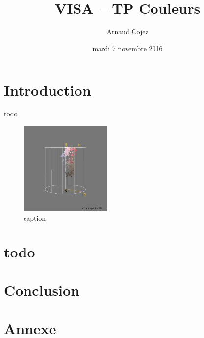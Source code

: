 \documentclass[a4paper]{article}
\begin{document}
\title{VISA -- TP Couleurs}
\author{Arnaud Cojez}
\date{mardi 7 novembre 2016}

\maketitle

\newpage
\tableofcontents
\newpage

\section{Introduction}

todo

\begin{figure}[h]
\begin{center}
\includegraphics[width=170px]{../resultats/e1_q1_k1_26.png}
\end{center}
\caption{caption}
\end{figure}


\clearpage

\section{todo}

\clearpage


\section{Conclusion}

\clearpage

\section{Annexe}
\end{document}
